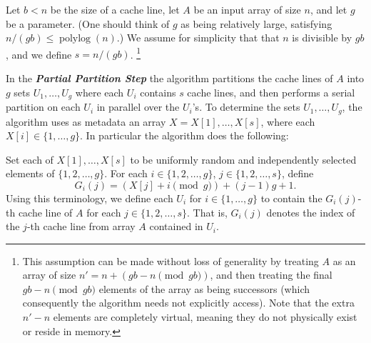 \documentclass[twoside,leqno,twocolumn]{article}
\newcommand{\polylog}{\operatorname{polylog}}
\newcommand{\defn}[1]{{\textit{\textbf{\boldmath #1}}}}
\renewcommand{\paragraph}[1]{\vspace{0.09in}\noindent{\bf \boldmath #1.}}
\begin{document}
\paragraph{Formal Algorithm Description} Let $b < n$ be the size of a cache line, let $A$ be an input array of size
$n$, and let $g$ be a parameter. (One should think of $g$ as being
relatively large, satisfying $n/(gb) \le
\polylog(n)$.)  We assume for simplicity that that $n$
is divisible by $gb$, and we define $s = n/(gb)$.
\footnote{This assumption can be made without loss of generality by treating $A$ as
an array of size $n' = n + {(gb - n \pmod {gb})}$, and then treating
the final $gb - n \pmod {gb}$ elements of the array as being
successors (which consequently the algorithm needs not explicitly
access). Note that the extra $n' - n$ elements are completely virtual, meaning they do not physically exist or reside in memory.


}

In the \defn{Partial Partition Step} the algorithm partitions the
cache lines of $A$ into $g$ sets $U_1, \ldots, U_{g}$ where each
$U_i$ contains $s$ cache lines, and then performs a serial
partition on each $U_i$ in parallel over the $U_i$'s. 
To determine the sets $U_1, \ldots, U_{g}$, the algorithm uses as
metadata an array $X = X[1], \ldots, X[s]$, where each $X[i] \in
\{1, \ldots, g\}$. In particular the algorithm does the following:

Set each of $X[1], \ldots, X[s]$ to be uniformly random and
independently selected elements of $\{1, 2, \ldots, g\}$. For each $i \in
\{1, 2, \ldots, g\}$, $j \in \{1, 2, \ldots, s\}$, define
$$G_i(j) = (X[j] + i \pmod g) + (j - 1)g + 1.$$ Using this
terminology, we define each $U_i$ for $i \in \{1, \ldots, g\}$ to
contain the $G_i(j)$-th cache line of $A$ for each $j \in \{1, 2,
\ldots, s\}$. That is, $G_i(j)$ denotes the index of the $j$-th
cache line from array $A$ contained in $U_i$.
\end{document}
